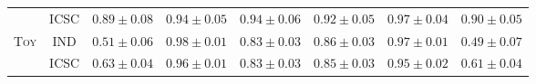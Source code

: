 \begin{table*}[!htbp]
\begin{center}
\begin{tiny}
\begin{sc}
{\begin{tabular}{cccccccc}
                                           & \acs{ICSC} & $0.89\pm0.08$ &
                    $0.94\pm0.05$ & $0.94\pm0.06$ & $0.92\pm0.05$ &
                    $0.97\pm0.04$ & $0.90\pm0.05$
                    \\
                    \multirow{ 2}{*}{\textsc{Toy}} & IND &
                    $0.51\pm0.06$ & $ 0.98\pm0.01$ & $0.83\pm0.03$ &
                    $0.86\pm0.03$ & $0.97\pm0.01$ & $0.49\pm0.07$\\
                                           & \acs{ICSC} & $0.63\pm0.04$ &
                    $0.96\pm0.01$ & $0.83\pm0.03$ & $0.85\pm0.03$ &
                    $0.95\pm0.02$ & $0.61\pm0.04$
                    \\
                    \bottomrule
                \end{tabular}}
            \end{sc}
        \end{tiny}
    \end{center}
    \addtolength{\tabcolsep}{3pt}
    \renewcommand{\arraystretch}{1.0}%
\end{table*}

